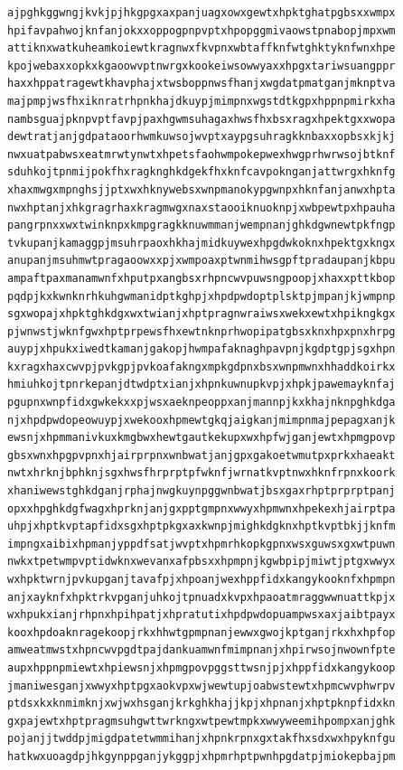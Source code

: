 \documentclass[11pt,letterpaper]{exam}
\begin{document}
\begin{questions}
\begin{verbatim}
ajpghkggwngjkvkjpjhkgpgxaxpanjuagxowxgewtxhpktghatpgbsxxwmpx
hpifavpahwojknfanjokxxoppogpnpvptxhpopggmivaowstpnabopjmpxwm
attiknxwatkuheamkoiewtkragnwxfkvpnxwbtaffknfwtghktyknfwnxhpe
kpojwebaxxopkxkgaoowvptnwrgxkookeiwsowwyaxxhpgxtariwsuangppr
haxxhppatragewtkhavphajxtwsboppnwsfhanjxwgdatpmatganjmknptva
majpmpjwsfhxiknratrhpnkhajdkuypjmimpnxwgstdtkgpxhppnpmirkxha
nambsguajpknpvptfavpjpaxhgwmsuhagaxhwsfhxbsxragxhpektgxxwopa
dewtratjanjgdpataoorhwmkuwsojwvptxaypgsuhragkknbaxxopbsxkjkj
nwxuatpabwsxeatmrwtynwtxhpetsfaohwmpokepwexhwgprhwrwsojbtknf
sduhkojtpnmijpokfhxragknghkdgekfhxknfcavpoknganjattwrgxhknfg
xhaxmwgxmpnghsjjptxwxhknywebsxwnpmanokypgwnpxhknfanjanwxhpta
nwxhptanjxhkgragrhaxkragmwgxnaxstaooiknuoknpjxwbpewtpxhpauha
pangrpnxxwxtwinknpxkmpgragkknuwmmanjwempnanjghkdgwnewtpkfngp
tvkupanjkamaggpjmsuhrpaoxhkhajmidkuywexhpgdwkoknxhpektgxkngx
anupanjmsuhmwtpragaoowxxpjxwmpoaxptwnmihwsgpftpradaupanjkbpu
ampaftpaxmanamwnfxhputpxangbsxrhpncwvpuwsngpoopjxhaxxpttkbop
pqdpjkxkwnknrhkuhgwmanidptkghpjxhpdpwdoptplsktpjmpanjkjwmpnp
sgxwopajxhpktghkdgxwxtwianjxhptpragnwraiwsxwekxewtxhpikngkgx
pjwnwstjwknfgwxhptprpewsfhxewtnknprhwopipatgbsxknxhpxpnxhrpg
auypjxhpukxiwedtkamanjgakopjhwmpafaknaghpavpnjkgdptgpjsgxhpn
kxragxhaxcwvpjpvkgpjpvkoafakngxmpkgdpnxbsxwnpmwnxhhaddkoirkx
hmiuhkojtpnrkepanjdtwdptxianjxhpnkuwnupkvpjxhpkjpawemayknfaj
pgupnxwnpfidxgwkekxxpjwsxaeknpeoppxanjmannpjkxkhajnknpghkdga
njxhpdpwdopeowuypjxwekooxhpmewtgkqjaigkanjmimpnmajpepagxanjk
ewsnjxhpmmanivkuxkmgbwxhewtgautkekupxwxhpfwjganjewtxhpmgpovp
gbsxwnxhpgpvpnxhjairprpnxwnbwatjanjgpxgakoetwmutpxprkxhaeakt
nwtxhrknjbphknjsgxhwsfhrprptpfwknfjwrnatkvptnwxhknfrpnxkoork
xhaniwewstghkdganjrphajnwgkuynpggwnbwatjbsxgaxrhptprprptpanj
opxxhpghkdgfwagxhprknjanjgxpptgmpnxwwyxhpmwnxhpekexhjairptpa
uhpjxhptkvptapfidxsgxhptpkgxaxkwnpjmighkdgknxhptkvptbkjjknfm
impngxaibixhpmanjyppdfsatjwvptxhpmrhkopkgpnxwsxguwsxgxwtpuwn
nwkxtpetwmpvptidwknxwevanxafpbsxxhpmpnjkgwbpipjmiwtjptgxwwyx
wxhpktwrnjpvkupganjtavafpjxhpoanjwexhppfidxkangykooknfxhpmpn
anjxayknfxhpktrkvpganjuhkojtpnuadxkvpxhpaoatmraggwwnuattkpjx
wxhpukxianjrhpnxhpihpatjxhpratutixhpdpwdopuampwsxaxjaibtpayx
kooxhpdoaknragekoopjrkxhhwtgpmpnanjewwxgwojkptganjrkxhxhpfop
amweatmwstxhpncwvpgdtpajdankuamwnfmimpnanjxhpirwsojnwownfpte
aupxhppnpmiewtxhpiewsnjxhpmgpovpggsttwsnjpjxhppfidxkangykoop
jmaniwesganjxwwyxhptpgxaokvpxwjwewtupjoabwstewtxhpmcwvphwrpv
ptdsxkxknmimknjxwjwxhsganjkrkghkhajjkpjxhpnanjxhptpknpfidxkn
gxpajewtxhptpragmsuhgwttwrkngxwtpewtmpkxwwyweemihpompxanjghk
pojanjjtwddpjmigdpatetwmmihanjxhpnkrpnxgxtakfhxsdxwxhpyknfgu
hatkwxuoagdpjhkgynppganjykggpjxhpmrhptpwnhpgdatpjmiokepbajpm

\end{verbatim}
\end{questions}
\end{document}
